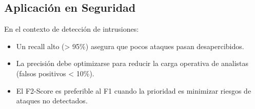 \subsection{Aplicación en Seguridad}	\label{sec:apli-met-seg}
En el contexto de detección de intrusiones:
\begin{itemize}
    \item Un recall alto (> 95\%) asegura que pocos ataques pasan desapercibidos.
    \item La precisión debe optimizarse para reducir la carga operativa de analistas (falsos positivos < 10\%).
    \item El F2-Score es preferible al F1 cuando la prioridad es minimizar riesgos de ataques no detectados.
\end{itemize}
